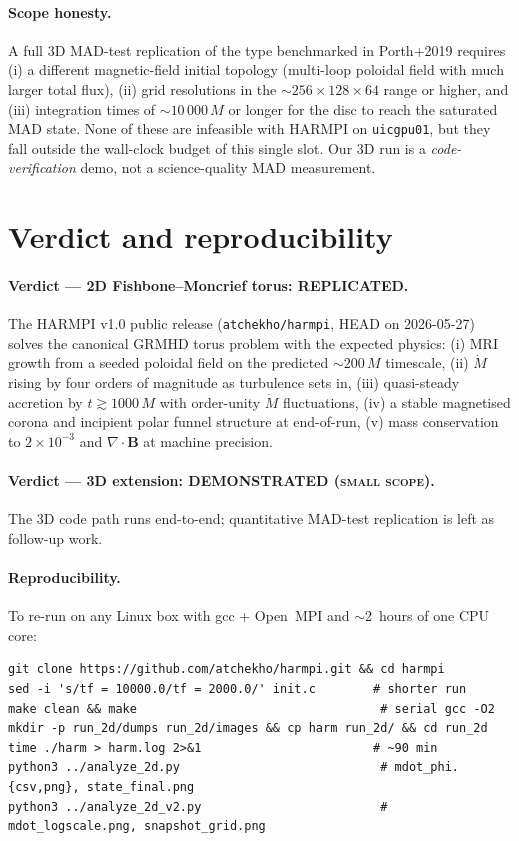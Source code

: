 \documentclass[11pt]{article}
\begin{document}
\paragraph{Scope honesty.} A full 3D MAD-test replication of the type benchmarked in
Porth+2019 requires (i) a different magnetic-field initial topology (multi-loop
poloidal field with much larger total flux), (ii) grid resolutions in the
$\sim 256\times128\times64$ range or higher, and (iii) integration times of
$\sim 10\,000\,M$ or longer for the disc to reach the saturated MAD state. None of
these are infeasible with \textsc{HARMPI} on \texttt{uicgpu01}, but they fall outside
the wall-clock budget of this single slot. Our 3D run is a \emph{code-verification}
demo, not a science-quality MAD measurement.

\section{Verdict and reproducibility}

\paragraph{Verdict --- 2D Fishbone--Moncrief torus: \textsc{REPLICATED}.}
The \textsc{HARMPI} v1.0 public release (\texttt{atchekho/harmpi}, HEAD on 2026-05-27)
solves the canonical GRMHD torus problem with the expected physics:
(i) MRI growth from a seeded poloidal field on the predicted $\sim 200\,M$ timescale,
(ii) $\dot M$ rising by four orders of magnitude as turbulence sets in,
(iii) quasi-steady accretion by $t \gtrsim 1000\,M$ with order-unity $\dot M$ fluctuations,
(iv) a stable magnetised corona and incipient polar funnel structure at end-of-run,
(v) mass conservation to $2\times10^{-3}$ and $\nabla\cdot\mathbf{B}$ at machine precision.

\paragraph{Verdict --- 3D extension: \textsc{DEMONSTRATED (small scope)}.} The 3D code path
runs end-to-end; quantitative MAD-test replication is left as follow-up work.

\paragraph{Reproducibility.} To re-run on any Linux box with gcc + Open~MPI and
$\sim$2~hours of one CPU core:
\begin{verbatim}
git clone https://github.com/atchekho/harmpi.git && cd harmpi
sed -i 's/tf = 10000.0/tf = 2000.0/' init.c        # shorter run
make clean && make                                  # serial gcc -O2
mkdir -p run_2d/dumps run_2d/images && cp harm run_2d/ && cd run_2d
time ./harm > harm.log 2>&1                        # ~90 min
python3 ../analyze_2d.py                            # mdot_phi.{csv,png}, state_final.png
python3 ../analyze_2d_v2.py                         # mdot_logscale.png, snapshot_grid.png
\end{verbatim}
\end{document}
